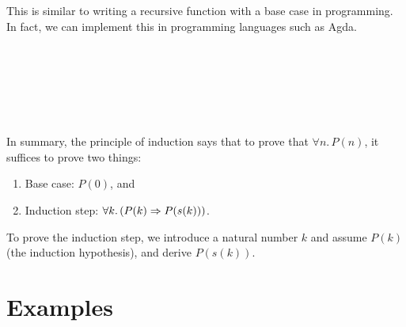 \documentclass{amsart}
\begin{document}
This is similar to writing a recursive function with a base case in programming.
In fact, we can implement this in programming languages such as Agda.

\begin{code}%
%
\>[2]\AgdaSpace{}%
\AgdaSymbol{:}%
\>[23I]\AgdaSymbol{\{}\AgdaSpace{}%
\AgdaSymbol{:}\AgdaSpace{}%
\AgdaSpace{}%
\AgdaSpace{}%
\AgdaSymbol{\}}\AgdaSpace{}%
\<%
\\
\>[.][@{}l@{}]\<[23I]%
\>[14]\AgdaSpace{}%
\AgdaSpace{}%
\<%
\\
%
\>[14]\AgdaSpace{}%
\AgdaSpace{}%
\AgdaSpace{}%
\AgdaSpace{}%
\AgdaSpace{}%
\AgdaSpace{}%
\AgdaSpace{}%
\AgdaSymbol{(}\AgdaSpace{}%
\AgdaSymbol{))}\AgdaSpace{}%
\<%
\\
%
\>[14]\AgdaSpace{}%
\AgdaSpace{}%
\AgdaSpace{}%
\AgdaSpace{}%
\<%
\\
%
\>[2]\AgdaSpace{}%
\AgdaSpace{}%
\AgdaSpace{}%
\AgdaSpace{}%
\AgdaSymbol{=}\AgdaSpace{}%
\<%
\\
%
\>[2]\AgdaSpace{}%
\AgdaSpace{}%
\AgdaSpace{}%
\AgdaSymbol{(}\AgdaSpace{}%
\AgdaSymbol{)}\AgdaSpace{}%
\AgdaSymbol{=}\AgdaSpace{}%
\AgdaSpace{}%
\AgdaSpace{}%
\AgdaSymbol{(}\AgdaSpace{}%
\AgdaSpace{}%
\AgdaSpace{}%
\AgdaSymbol{)}\<%
\end{code}

In summary, the principle of induction says that to prove that $\forall n.\,P(n)$, it suffices to prove two things:
\begin{enumerate}
\item Base case: $P(0)$, and
\item Induction step: $\forall k.\,(P(k) \Rightarrow P(s(k)))$.
\end{enumerate}
To prove the induction step, we introduce a natural number $k$ and assume $P(k)$ (the induction hypothesis), and derive $P(s(k))$.

\section{Examples}
\label{sec:examples}
\end{document}

